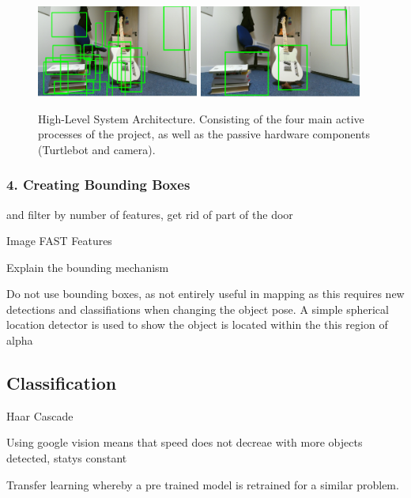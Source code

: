 \documentclass{mproj}
\begin{document}
\begin{figure}
   \caption{High-Level System Architecture. Consisting of the four main active processes of the project, as well as the passive hardware components (Turtlebot and camera).}
   \centering
   \includegraphics[width=0.475\textwidth]{images/many.png}
   \hfill
   \includegraphics[width=0.475\textwidth]{images/clusters.png}
\end{figure}



\subsubsection{4. Creating Bounding Boxes}



 and filter by number of features, get rid of part of the door
 
 Image FAST Features
 
 Explain the bounding mechanism
 
 Do not use bounding boxes, as not entirely useful in mapping as this requires new detections and classifiations when changing the object pose. A simple spherical location detector is used to show the object is located within the this region of alpha

\subsection{Classification}

Haar Cascade

Using google vision means that speed does not decreae with more objects detected, statys constant

Transfer learning whereby a pre trained model is retrained for a similar problem.
\end{document}
